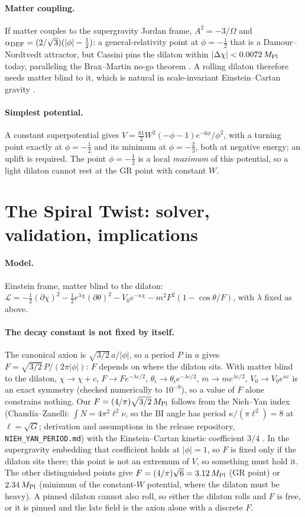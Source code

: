 \documentclass[11pt]{article}
\newcommand{\Mp}{M_{\rm Pl}}
\begin{document}
\paragraph{Matter coupling.} If matter couples to the supergravity Jordan frame, $A^2=-3/\Omega$ and
$\alpha_{\rm DEF}=(2/\sqrt3)(|\phi|-\tfrac12)$: a general-relativity point at $\phi=-\tfrac12$ that is a
Damour--Nordtvedt attractor, but Cassini pins the dilaton within $|\Delta\chi|<0.0072\,\Mp$ today, paralleling the
Brax--Martin no-go theorem \cite{brax2007}. A rolling dilaton therefore needs matter blind to it, which is natural in
scale-invariant Einstein--Cartan gravity \cite{karananas2021,piani2022}.

\paragraph{Simplest potential.} A constant superpotential gives $V=\tfrac{81}{2}W^2(-\phi-1)e^{-6\phi}/\phi^2$, with a
turning point exactly at $\phi=-\tfrac12$ and its minimum at $\phi=-\tfrac23$, both at negative energy; an uplift is
required. The point $\phi=-\tfrac12$ is a local \emph{maximum} of this potential, so a light dilaton cannot rest at
the GR point with constant $W$.

\section{The Spiral Twist: solver, validation, implications}
\paragraph{Model.} Einstein frame, matter blind to the dilaton:
$\mathcal L=-\tfrac12(\partial\chi)^2-\tfrac12e^{\lambda\chi}(\partial\theta)^2-V_0e^{-\kappa\chi}-m^2F^2(1-\cos\theta/F)$,
with $\lambda$ fixed as above.
\paragraph{The decay constant is not fixed by itself.} The canonical axion is $\sqrt{3/2}\,a/|\phi|$, so a period $P$ in $a$
gives $F=\sqrt{3/2}\,P/(2\pi|\phi|)$: $F$ depends on where the dilaton sits. With matter blind to the dilaton,
$\chi\to\chi+c$, $F\to Fe^{-\lambda c/2}$, $\theta_i\to\theta_ie^{-\lambda c/2}$, $m\to me^{\lambda c/2}$,
$V_0\to V_0e^{\kappa c}$ is an exact symmetry (checked numerically to $10^{-9}$), so a value of $F$ alone constrains
nothing. Our $F=(4/\pi)\sqrt{3/2}\,\Mp$ follows from the Nieh--Yan index (Chand\'ia--Zanelli: $\int N=4\pi^2\ell^2\nu$,
so the BI angle has period $\kappa/(\pi\ell^2)=8$ at $\ell=\sqrt G$; derivation and assumptions in the release
repository, \texttt{NIEH\_YAN\_PERIOD.md}) with the Einstein--Cartan kinetic coefficient $3/4$ \cite{calcagni2009}. In the
supergravity embedding that coefficient holds at $|\phi|=1$, so $F$ is fixed only if the dilaton sits there; this
point is not an extremum of $V$, so something must hold it. The other distinguished points give $F=(4/\pi)\sqrt6=3.12\,\Mp$ (GR point) or
$2.34\,\Mp$ (minimum of the constant-$W$ potential, where the dilaton must be heavy). A pinned dilaton cannot also roll,
so either the dilaton rolls and $F$ is free, or it is pinned and the late field is the axion alone with a discrete $F$.
\end{document}
